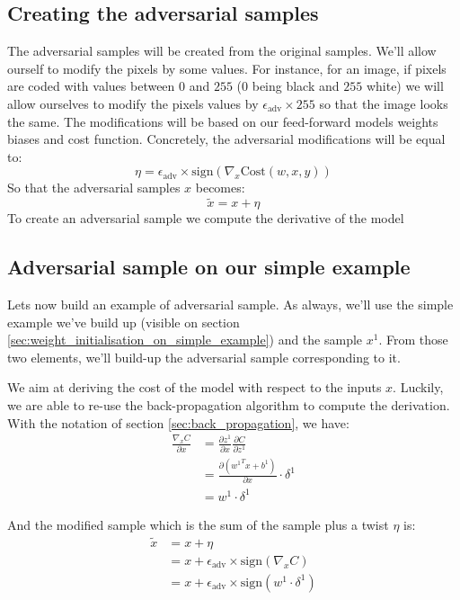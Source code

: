 		

	\subsection{Creating the adversarial samples}
	\label{sec:creating_the_adversarial_samples}
		The adversarial samples will be created from the original samples. We'll allow ourself to modify the pixels by some values. For instance, for an image, if pixels are coded with values between $0$ and $255$ ($0$ being black and $255$ white) we will allow ourselves to modify the pixels values by $\epsilon_{\text{adv}} \times 255$ so that the image looks the same. The modifications will be based on our feed-forward models weights biases and cost function. Concretely, the adversarial modifications will be equal to:
		$$ \eta = \epsilon_{\text{adv}} \times \text{sign}(\nabla_x \text{Cost}(w,x,y)) $$
		So that the adversarial samples $x$ becomes:
		$$ \tilde{x} = x + \eta $$
		To create an adversarial sample we compute the derivative of the model 


	\subsection{Adversarial sample on our simple example}
	\label{sub:adversarial_sample_on_the_simple_example}
		Lets now build an example of adversarial sample. As always, we'll use the simple example we've build up (visible on section \ref{sec:weight_initialisation_on_simple_example}) and the sample $x^1$. From those two elements, we'll build-up the adversarial sample corresponding to it.

		We aim at deriving the cost of the model with respect to the inputs $x$. Luckily, we are able to re-use the back-propagation algorithm to compute the derivation. With the notation of section \ref{sec:back_propagation}, we have:
		\begin{equation}
			\begin{split}
				\frac{\nabla_x C}{\partial x } 
				&= \frac{\partial z^1}{\partial x} \frac{\partial C}{\partial z^1 } \\
				&= \frac{\partial \left({w^1}^Tx+b^1 \right)}{\partial x} \cdot \delta^1 \\
				&= w^1 \cdot \delta^1
			\end{split}
		\end{equation}

		And the modified sample which is the sum of the sample plus a twist $\eta$ is:
		\begin{equation}
			\begin{split}
				\tilde{x}
				&= x + \eta \\
				&= x + \epsilon_{\text{adv}} \times \text{sign}(\nabla_x C) \\
				&= x + \epsilon_{\text{adv}} \times \text{sign}( w^1 \cdot \delta^1 )
			\end{split}
		\end{equation}

